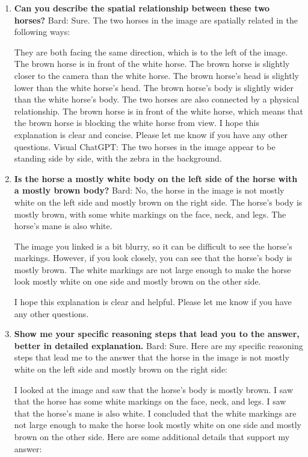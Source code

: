     \begin{enumerate}
        \item \textbf{Can you describe the spatial relationship between these two horses?}
        \subitem Bard:        
        Sure. The two horses in the image are spatially related in the following ways:

        They are both facing the same direction, which is to the left of the image.
        The brown horse is in front of the white horse.
        The brown horse is slightly closer to the camera than the white horse.
        The brown horse's head is slightly lower than the white horse's head.
        The brown horse's body is slightly wider than the white horse's body.
        The two horses are also connected by a physical relationship. The brown horse is in front of the white horse, which means that the brown horse is blocking the white horse from view.
        I hope this explanation is clear and concise. Please let me know if you have any other questions.
        \subitem Visual ChatGPT: The two horses in the image appear to be standing side by side, with the zebra in the background.
        \item \textbf{Is the horse a mostly white body on the left side of the horse with a mostly brown body?}
        \subitem Bard: 
        No, the horse in the image is not mostly white on the left side and mostly brown on the right side. The horse's body is mostly brown, with some white markings on the face, neck, and legs. The horse's mane is also white.

        The image you linked is a bit blurry, so it can be difficult to see the horse's markings. However, if you look closely, you can see that the horse's body is mostly brown. The white markings are not large enough to make the horse look mostly white on one side and mostly brown on the other side.

        I hope this explanation is clear and helpful. Please let me know if you have any other questions.
        \item \textbf{Show me your specific reasoning steps that lead you to the answer, better in detailed explanation.}
        \subitem Bard: 
        Sure. Here are my specific reasoning steps that lead me to the answer that the horse in the image is not mostly white on the left side and mostly brown on the right side:

        I looked at the image and saw that the horse's body is mostly brown.
        I saw that the horse has some white markings on the face, neck, and legs.
        I saw that the horse's mane is also white.
        I concluded that the white markings are not large enough to make the horse look mostly white on one side and mostly brown on the other side.
        Here are some additional details that support my answer:


\end{enumerate}
